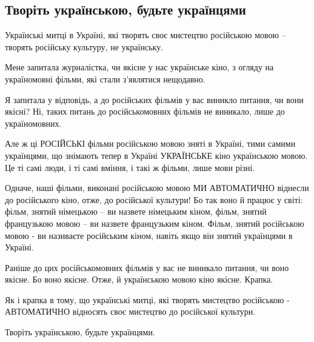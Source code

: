  
 
 
 
 
 
\subsection{Творіть українською, будьте українцями}
\label{sec:29_10_2020.fb.nitsoi_larysa.1.tvorit_ukrainskoju}

Українські митці в Україні, які творять своє мистецтво російською мовою – творять російську культуру, не українську. 

Мене запитала журналістка, чи якісне у нас українське кіно, з огляду на україномовні фільми, які стали з’являтися нещодавно.

Я запитала у відповідь, а до російських фільмів у вас виникло питання, чи вони
якісні? Ні, таких питань до російськомовних фільмів не виникало, лише до
україномовних.

Але ж ці РОСІЙСЬКІ фільми російською мовою зняті в Україні, тими самими
українцями, що знімають тепер в Україні УКРАЇНСЬКЕ кіно українською мовою. Це
ті самі люди, і ті самі вміння, і такі ж фільми, лише мови різні. 

Одначе, наші фільми, виконані російською мовою МИ АВТОМАТИЧНО віднесли до
російського кіно, отже, до російської культури! Бо так воно й працює у світі:
фільм, знятий німецькою – ви назвете німецьким кіном, фільм, знятий французькою
мовою – ви назвете французьким кіном. Фільм, знятий російською мовою - ви
називаєте російським кіном, навіть якщо він знятий українцями в Україні. 

Раніше до цих російськомовних фільмів у вас не виникало питання, чи воно
якісне. Бо воно якісне. Отже, й українською мовою кіно якісне. Крапка.

Як і крапка в тому, що українські митці, які творять мистецтво російською -
АВТОМАТИЧНО відносять своє мистецтво до російської культури. 

Творіть українською, будьте українцями.
